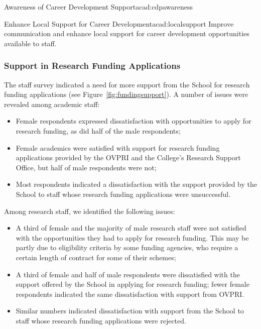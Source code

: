 \newcommand{\actcdpawareness}{%
Increase awareness of existing menue of career development support.}
\begin{actionblock}{\ksspace{}Awareness of Career Development Support}{acad:cdpawareness}
\actacadpdrs
\hfill{
    \hypersetup{hidelinks}
    \hyperlink{c13}{\gotoactionsymbol{}}
}
\end{actionblock}

\newcommand{\actacadlocalsupport}{%
Improve communication and enhance local support for career development opportunities available to staff.}
\begin{actionblock}{\ksspace{}Enhance Local Support for Career Development}{acad:localsupport}
\actacadlocalsupport
\hfill{
    \hypersetup{hidelinks}
    \hyperlink{c18}{\gotoactionsymbol{}}
}
\end{actionblock}

\subsubsection{Support in Research Funding Applications}
The staff survey indicated a need for more support from the School for research funding applications (see Figure~\ref{fig:fundingsupport}). A number of issues were revealed among academic staff:

\begin{itemize}
    \item Female respondents expressed dissatisfaction with opportunities to apply for research funding, as did half of the male respondents;
    \item Female academics were satisfied with support for research funding applications provided by the \ac{OVPRI} and the College's Research Support Office, but half of male respondents were not;
    \item Most respondents indicated a dissatisfaction with the support provided by the School to staff whose research funding applications were unsuccessful. 
\end{itemize}



Among research staff, we identified the following issues:

\begin{itemize}
    \item A third of female and the majority of male research staff were not satisfied with the opportunities they had to apply for research funding. This may be partly due to eligibility criteria by some funding agencies, who require a certain length of contract for some of their schemes;
    \item A third of female and half of male respondents were dissatisfied with the support offered by the School in applying for research funding; fewer female respondents indicated the same dissatisfaction with support from \ac{OVPRI}. 
    \item Similar numbers indicated dissatisfaction with support from the School to staff whose research funding applications were rejected.
\end{itemize}


